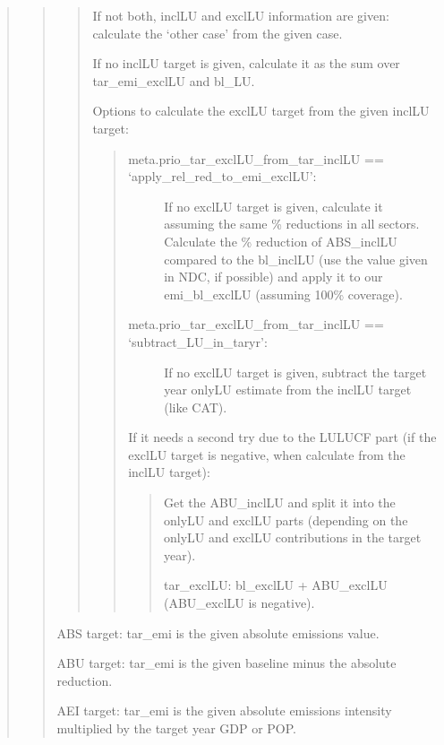 \documentclass[letterpaper,10pt,english]{sphinxmanual}
\begin{document}
\begin{quote}
\begin{quote}
\begin{quote}

If not both, inclLU and exclLU information are given:
calculate the ‘other case’ from the given case.

If no inclLU target is given, calculate it as the sum over tar\_emi\_exclLU and bl\_LU.

Options to calculate the exclLU target from the given inclLU target:
\begin{quote}
\begin{description}
\item[{meta.prio\_tar\_exclLU\_from\_tar\_inclLU == ‘apply\_rel\_red\_to\_emi\_exclLU’:}] \leavevmode
If no exclLU target is given, calculate it assuming the same \% reductions in all sectors.
Calculate the \% reduction of ABS\_inclLU compared to the bl\_inclLU (use the value given in NDC, if possible)
and apply it to our emi\_bl\_exclLU (assuming 100\% coverage).

\item[{meta.prio\_tar\_exclLU\_from\_tar\_inclLU == ‘subtract\_LU\_in\_taryr’:}] \leavevmode
If no exclLU target is given, subtract the target year onlyLU estimate from the inclLU target (like CAT).

\end{description}

If it needs a second try due to the LULUCF part (if the exclLU target is negative, when calculate from the inclLU target):
\begin{quote}

Get the ABU\_inclLU and split it into the onlyLU and exclLU parts
(depending on the onlyLU and exclLU contributions in the target year).

tar\_exclLU: bl\_exclLU + ABU\_exclLU (ABU\_exclLU is negative).
\end{quote}
\end{quote}
\end{quote}

ABS target: tar\_emi is the given absolute emissions value.

ABU target: tar\_emi is the given baseline minus the absolute reduction.

AEI target: tar\_emi is the given absolute emissions intensity multiplied by the target year GDP or POP.


\end{quote}
\end{quote}
\end{document}
